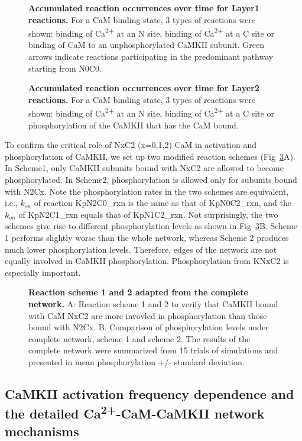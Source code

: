 \documentclass[10pt,letterpaper]{article}
\begin{document}
\begin{figure}[!h]
	\caption{{\bf Accumulated reaction occurrences over time for Layer1 reactions.}
	For a CaM binding state, 3 types of reactions were shown: binding of Ca\textsuperscript{2+} at an N site, binding of Ca\textsuperscript{2+} at a C site or binding of CaM to an unphosphorylated CaMKII subunit. Green arrows indicate reactions participating in the predominant pathway starting from N0C0.
	}
\label{fig4}
\end{figure}

\begin{figure}[!h]
	\caption{{\bf Accumulated reaction occurrences over time for Layer2 reactions.}
	For a CaM binding state, 3 types of reactions were shown: binding of Ca\textsuperscript{2+} at an N site, binding of Ca\textsuperscript{2+} at a C site or phosphorylation of the CaMKII that has the CaM bound.
	}
\label{fig5}
\end{figure}


To confirm the critical role of NxC2 (x=0,1,2) CaM in activation and phosphorylation of CaMKII, we set up two modified reaction schemes (Fig~\ref{fig6}A). In Scheme1, only CaMKII subunits bound with NxC2 are allowed to become phosphorylated. In Scheme2, phosphorylation is allowed only for subunits bound with N2Cx. Note the phosphorylation rates in the two schemes are equivalent, i.e., $k_{on}$ of reaction KpN2C0\_rxn is the same as that of KpN0C2\_rxn, and the $k_{on}$ of KpN2C1\_rxn equals that of KpN1C2\_rxn. Not surprisingly, the two schemes give rise to different phosphorylation levels as shown in Fig~\ref{fig6}B. Scheme 1 performs slightly worse than the whole network, whereas Scheme 2 produces much lower phosphorylation levels. Therefore, edges of the network are not equally involved in CaMKII phosphorylation. Phosphorylation from KNxC2 is especially important.  

\begin{figure}[!h]
	\caption{{\bf Reaction scheme 1 and 2 adapted from the complete network.}
	A: Reaction scheme 1 and 2 to verify that CaMKII bound with CaM NxC2 are more invovled in phosphorylation than those bound with N2Cx.
	B. Comparison of phosphorylation levels under complete network, scheme 1 and scheme 2. The results of the complete network were summarized from 15 trials of simulations and presented in mean phosphorylation +/- standard deviation.
	} 
\label{fig6}
\end{figure}


\subsection*{CaMKII activation frequency dependence and the detailed Ca\textsuperscript{2+}-CaM-CaMKII network mechanisms}
\end{document}
